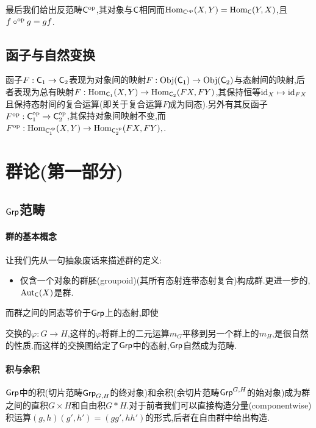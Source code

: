 \documentclass[11pt]{article} %
\begin{document}
最后我们给出反范畴$\mathsf{C}^{\mathrm{op}}$,其对象与$\mathsf{C}$相同而$\operatorname{Hom}_{\mathsf{C}^{\mathrm{op}}}(X,Y)=\operatorname{Hom}_{\mathsf{C}}(Y,X)$,且$f\circ^{\mathrm{op}} g=gf$.


\subsection{函子与自然变换}
函子$F:\mathsf{C}_1\to\mathsf{C}_2$表现为对象间的映射$F:\mathrm{Obj}(\mathsf{C}_1)\to\mathrm{Obj}(\mathsf{C}_2)$与态射间的映射,后者表现为总有映射$F:\operatorname{Hom}_{\mathsf{C}_1}(X,Y)\to\operatorname{Hom}_{\mathsf{C}_2}(FX,FY)$,其保持恒等$\mathrm{id}_X\mapsto \mathrm{id}_{FX}$且保持态射间的复合运算(即关于复合运算$F$成为同态).另外有其反函子$F^{\mathrm{op}}:\mathsf{C}_1^{\mathrm{op}}\to\mathsf{C}_2^{\mathrm{op}}$,其保持对象间映射不变,而$F^{\mathrm{op}}:\operatorname{Hom}_{\mathsf{C}_1^{\mathrm{op}}}(X,Y)\to\operatorname{Hom}_{\mathsf{C}_2^{\mathrm{op}}}(FX,FY), $.

\section{群论(第一部分)}
\subsection{$\mathsf{Grp}$范畴}
\paragraph{群的基本概念}
让我们先从一句抽象废话来描述群的定义:
\begin{itemize}
    \item 仅含一个对象的群胚(groupoid)(其所有态射连带态射复合)构成群.更进一步的,$\operatorname{Aut}_{\mathsf{C}}(X)$是群.
\end{itemize}
而群之间的同态等价于$\mathsf{Grp}$上的态射,即使
交换的$\varphi:G\to H$,这样的$\varphi$将群上的二元运算$m_G$平移到另一个群上的$m_H$,是很自然的性质.而这样的交换图给定了$\mathsf{Grp}$中的态射,$\mathsf{Grp}$自然成为范畴.

\paragraph{积与余积}
$\mathsf{Grp}$中的积(切片范畴$\mathsf{Grp}_{G,H}$的终对象)和余积(余切片范畴$\mathsf{Grp}^{G,H}$的始对象)成为群之间的直积$G\times H$和自由积$G*H$.对于前者我们可以直接构造分量(componentwise)积运算$(g,h)(g',h')=(gg',hh')$的形式,后者在自由群中给出构造.
\end{document}
